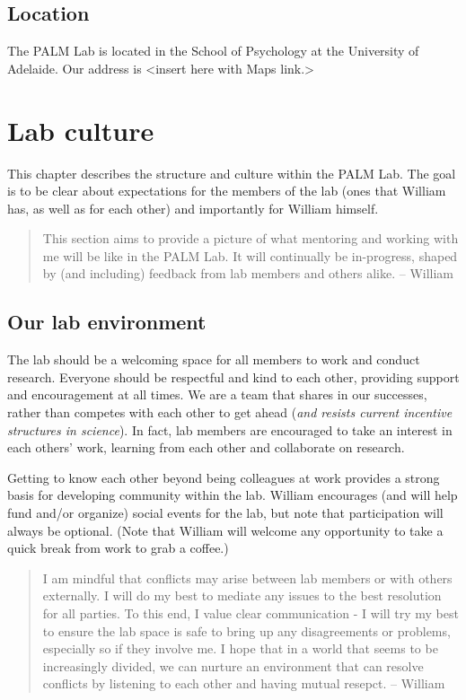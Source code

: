 \documentclass[
]{book}
\theoremstyle{definition}
\theoremstyle{definition}
\theoremstyle{definition}
\theoremstyle{definition}
\theoremstyle{remark}
\begin{document}
\hypertarget{location}{%
\section{Location}\label{location}}

The PALM Lab is located in the School of Psychology at the University of Adelaide. Our address is \textless insert here with Maps link.\textgreater{}

\hypertarget{lab-culture}{%
\chapter{Lab culture}\label{lab-culture}}

This chapter describes the structure and culture within the PALM Lab. The goal is to be clear about expectations for the members of the lab (ones that William has, as well as for each other) and importantly for William himself.

\begin{quote}
This section aims to provide a picture of what mentoring and working with me will be like in the PALM Lab. It will continually be in-progress, shaped by (and including) feedback from lab members and others alike. -- William
\end{quote}

\hypertarget{lab-environment}{%
\section{Our lab environment}\label{lab-environment}}

The lab should be a welcoming space for all members to work and conduct research. Everyone should be respectful and kind to each other, providing support and encouragement at all times. We are a team that shares in our successes, rather than competes with each other to get ahead (\emph{and resists current incentive structures in science}). In fact, lab members are encouraged to take an interest in each others' work, learning from each other and collaborate on research.

Getting to know each other beyond being colleagues at work provides a strong basis for developing community within the lab. William encourages (and will help fund and/or organize) social events for the lab, but note that participation will always be optional. (Note that William will welcome any opportunity to take a quick break from work to grab a coffee.)

\begin{quote}
I am mindful that conflicts may arise between lab members or with others externally. I will do my best to mediate any issues to the best resolution for all parties. To this end, I value clear communication - I will try my best to ensure the lab space is safe to bring up any disagreements or problems, especially so if they involve me. I hope that in a world that seems to be increasingly divided, we can nurture an environment that can resolve conflicts by listening to each other and having mutual resepct. -- William
\end{quote}
\end{document}
